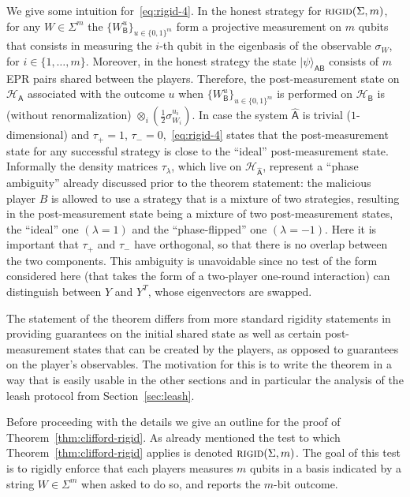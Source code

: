 \documentclass[11pt]{article}
\newcommand{\ket}[1]{|#1\rangle}
\newcommand{\reg}[1]{{\textsf{#1}}}
\newcommand{\mH}{\mathcal{H}}
\newcommand{\rigid}{\textsc{rigid}}
\begin{document}
We give some intuition for~\eqref{eq:rigid-4}. In the honest strategy for $\rigid(\Sigma,m)$, for any $W\in \Sigma^m$ the $\{ W_\reg{B}^u\}_{u\in\{0,1\}^m}$ form a projective measurement on $m$ qubits that consists in measuring the $i$-th qubit in the eigenbasis of the observable $\sigma_{W}$, for $i\in\{1,\ldots,m\}$. Moreover, in the honest strategy the state $\ket{\psi}_{\reg{AB}}$ consists of $m$ EPR pairs shared between the players. Therefore, the post-measurement state on $\mH_\reg{A}$ associated with the outcome $u$ when  $\{ W_\reg{B}^u\}_{u\in\{0,1\}^m}$ is performed on $\mH_\reg{B}$ is (without renormalization) $\otimes_i (\frac{1}{2}\sigma_{W_i}^{u_i})$. In case the system $\hat{\reg{A}}$ is trivial ($1$-dimensional) and $\tau_+=1$, $\tau_-=0$,~\eqref{eq:rigid-4}  states that the post-measurement state for any successful strategy is close to the ``ideal'' post-measurement state. Informally the density matrices $\tau_\lambda$, which live on $\mH_{\hat{\reg{A}}}$, represent a ``phase ambiguity'' already discussed prior to the theorem statement: the malicious player $B$ is allowed to use a strategy that is a mixture of two strategies, resulting in the post-measurement state being a mixture of two post-measurement states, the ``ideal'' one $(\lambda=1)$ and the ``phase-flipped'' one $(\lambda=-1)$. Here it is important that $\tau_+$ and $\tau_-$ have orthogonal, so that there is no overlap between the two components. This ambiguity is unavoidable since no test of the form considered here (that takes the form of a two-player one-round interaction) can distinguish between $Y$ and $Y^T$, whose eigenvectors are swapped.  

The statement of the theorem differs from more standard rigidity statements in providing guarantees on the initial shared state as well as certain post-measurement states that can be created by the players, as opposed to guarantees on the player's observables. The motivation for this is to write the theorem in a way that is easily usable in the other sections and in particular the analysis of the leash protocol from Section~\ref{sec:leash}. 

\medskip

Before proceeding with the details we give an outline for the proof of Theorem~\ref{thm:clifford-rigid}. As already mentioned the test to which Theorem~\ref{thm:clifford-rigid} applies is denoted $\rigid(\Sigma,m)$. The goal of this test is to rigidly enforce that each players measures $m$ qubits in a basis indicated by a string $W\in \Sigma^m$ when asked to do so, and reports the $m$-bit outcome. 
\end{document}

